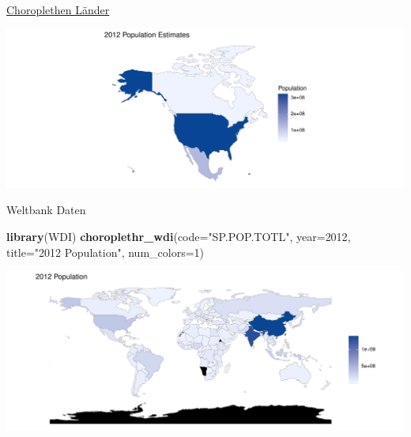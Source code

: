 \documentclass[ignorenonframetext,]{beamer}
\newenvironment{Shaded}{\begin{snugshade}}{\end{snugshade}}
\newcommand{\DataTypeTok}[1]{\textcolor[rgb]{0.13,0.29,0.53}{#1}}
\newcommand{\DecValTok}[1]{\textcolor[rgb]{0.00,0.00,0.81}{#1}}
\newcommand{\KeywordTok}[1]{\textcolor[rgb]{0.13,0.29,0.53}{\textbf{#1}}}
\newcommand{\NormalTok}[1]{#1}
\newcommand{\StringTok}[1]{\textcolor[rgb]{0.31,0.60,0.02}{#1}}
\begin{document}
\begin{frame}{\href{http://mirrors.softliste.de/cran/web/packages/choroplethr/vignettes/d-country-choropleth.html}{Choroplethen
Länder}}
\protect\hypertarget{choroplethen-lander-1}{}

\includegraphics{A5_Choroplethen_files/figure-beamer/unnamed-chunk-27-1.pdf}

\end{frame}

\begin{frame}[fragile]{Weltbank Daten}
\protect\hypertarget{weltbank-daten}{}

\begin{Shaded}
\begin{Highlighting}[]
\KeywordTok{library}\NormalTok{(WDI) }
\KeywordTok{choroplethr_wdi}\NormalTok{(}\DataTypeTok{code=}\StringTok{"SP.POP.TOTL"}\NormalTok{, }\DataTypeTok{year=}\DecValTok{2012}\NormalTok{, }
                \DataTypeTok{title=}\StringTok{"2012 Population"}\NormalTok{, }
                \DataTypeTok{num_colors=}\DecValTok{1}\NormalTok{)}
\end{Highlighting}
\end{Shaded}

\includegraphics{A5_Choroplethen_files/figure-beamer/unnamed-chunk-28-1.pdf}

\end{frame}
\end{document}
